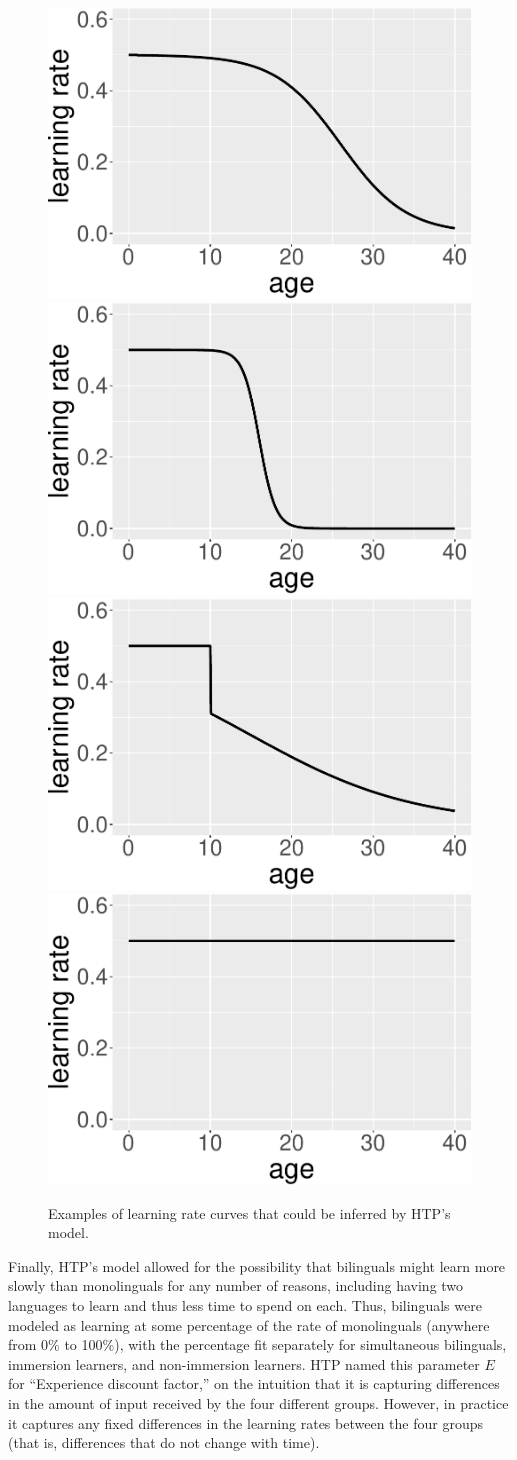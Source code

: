 \documentclass[
  english,
  doc,floatsintext]{apa6}
\begin{document}
\begin{figure}
\includegraphics[width=0.24\linewidth]{SlikResponse_rmd_files/figure-latex/sigmoids-1} \includegraphics[width=0.24\linewidth]{SlikResponse_rmd_files/figure-latex/sigmoids-2} \includegraphics[width=0.24\linewidth]{SlikResponse_rmd_files/figure-latex/sigmoids-3} \includegraphics[width=0.24\linewidth]{SlikResponse_rmd_files/figure-latex/sigmoids-4} \caption{Examples of learning rate curves that could be inferred by HTP's model.}\label{fig:sigmoids}
\end{figure}

Finally, HTP's model allowed for the possibility that bilinguals might learn more slowly than monolinguals for any number of reasons, including having two languages to learn and thus less time to spend on each. Thus, bilinguals were modeled as learning at some percentage of the rate of monolinguals (anywhere from 0\% to 100\%), with the percentage fit separately for simultaneous bilinguals, immersion learners, and non-immersion learners. HTP named this parameter \(E\) for ``Experience discount factor,'' on the intuition that it is capturing differences in the amount of input received by the four different groups. However, in practice it captures any fixed differences in the learning rates between the four groups (that is, differences that do not change with time).
\end{document}
